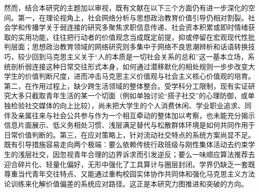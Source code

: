 然而，结合本研究的主题加以审视，既有文献在以下三个方面仍有进一步深化的空间。第一，在理论视角上，社会网络分析与思想政治教育价值引导仍相对割裂。社会学和传播学关于弱连接的研究多聚焦求职信息传递、社会资本积累或即时情绪获取的实用功能，往往把行动者的价值观念当成既定前提，抑或停留在宏观现代性批判层面；思想政治教育领域的网络研究则多集中于网络不良思潮辨析和话语转换技巧，较少回到马克思主义关于“人的本质是一切社会关系的总和”这一基本立场，系统剖析弱连接这种日常交往形式本身，如何通过潜移默化的相处规则一步步改变大学生的价值判断尺度，进而冲击马克思主义价值观与社会主义核心价值观的培育。第二，在作用过程上，缺少跨生活领域的整体整合。受学科分工限制，现有实证研究大多只截取青年生活的某一个切面（例如单独讨论“搭子社交”的心理防御，或单独检验社交媒体的向上比较），尚未把大学生的个人消费休闲、学业职业追求、同伴及亲属往来与社会公共参与作为一个相互牵动的整体加以考察，也未能充分揭示信息片面展示、低义务相处习惯、浅层满足替代与松散群体环境是如何共同作用于日常价值判断的。第三，在应对策略上，针对流动社交特点的系统方案尚显不足。既有引导措施容易走向两个极端：要么依赖传统行政班级与刚性集体活动去约束学生的浅层社交，因忽视青年合理的边界诉求而引发逆反；要么一味顺应算法推荐去迎合碎片化、轻量化偏好，无形中强化了工具算计与圈层封闭。学界仍缺乏一套既尊重当代青年交往特点、又能通过重构校园实体协作共同体和强化马克思主义方法论训练来化解价值偏差的系统应对路径。这正是本研究力图推进和突破的方向。